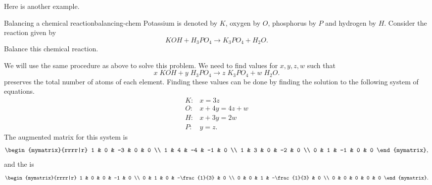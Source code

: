 Here is another example.

\begin{example}{Balancing a chemical reaction}{balancing-chem}
  Potassium is denoted by $K$, oxygen by $O$, phosphorus by $P$ and
  hydrogen by $H$.  Consider the reaction given by
  \begin{equation*}
    KOH+H_3PO_4\rightarrow K_3PO_4+H_2O.
  \end{equation*}
  Balance this chemical reaction.
\end{example}

\begin{solution}
  We will use the same procedure as above to solve this problem. We
  need to find values for $x,y,z,w$ such that
  \begin{equation*}
    x\;KOH+y\;H_3PO_4\rightarrow z\;K_3PO_4+w\;H_2O.
  \end{equation*}
  preserves the total number of atoms of each element.  Finding these
  values can be done by finding the solution to the following system
  of equations.
  \begin{equation*}
    \begin{array}{cl}
      K: & x=3z \\
      O: & x+4y=4z+w \\
      H: & x+3y=2w \\
      P: & y=z.
    \end{array}
  \end{equation*}
  The augmented matrix for this system is
  \begin{equation*}
    \begin{mymatrix}{rrrr|r}
      1 & 0 & -3 & 0 & 0 \\
      1 & 4 & -4 & -1 & 0 \\
      1 & 3 & 0 & -2 & 0 \\
      0 & 1 & -1 & 0 & 0
    \end{mymatrix},
  \end{equation*}
  and the {\rref} is
  \begin{equation*}
    \def\arraystretch{1.2}
    \begin{mymatrix}{rrrr|r}
      1 & 0 & 0 & -1 & 0 \\
      0 & 1 & 0 & -\frac{1}{3} & 0 \\
      0 & 0 & 1 & -\frac{1}{3} & 0 \\
      0 & 0 & 0 & 0 & 0
    \end{mymatrix}.
  \end{equation*}


\end{solution}
